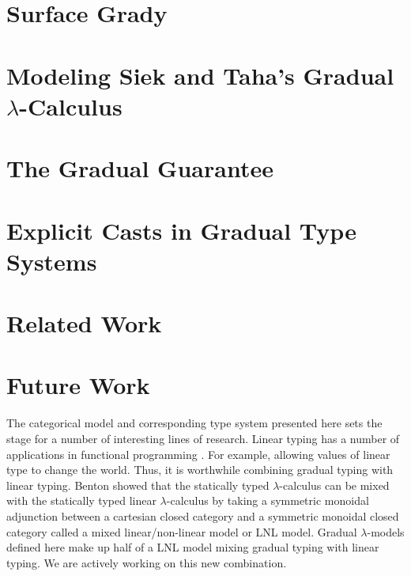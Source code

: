 \documentclass[sigplan]{acmart}\settopmatter{printfolios=true}
\begin{document}
\section{Surface Grady}
\label{sec:surface_grady}


\section{Modeling Siek and Taha's Gradual $\lambda$-Calculus}
\label{sec:modeling_siek_and_taha's_gradual_lambda-calculus}


\section{The Gradual Guarantee}
\label{sec:the_gradual_guarantee}


\section{Explicit Casts in Gradual Type Systems}
\label{sec:explicit_casts_in_gradual_type_systems}


\section{Related Work}
\label{sec:related_work}



\section{Future Work}
\label{sec:conclusion}
The categorical model and corresponding type system presented here
sets the stage for a number of interesting lines of research.  Linear
typing has a number of applications in functional programming
\cite{Wadler:1990}. For example, allowing values of linear type to
change the world.  Thus, it is worthwhile combining gradual typing
with linear typing.  Benton \cite{Benton:1995} showed that the
statically typed $\lambda$-calculus can be mixed with the statically
typed linear $\lambda$-calculus by taking a symmetric monoidal
adjunction between a cartesian closed category and a symmetric
monoidal closed category called a mixed linear/non-linear model or LNL
model.  Gradual $\lambda$-models defined here make up half of a LNL
model mixing gradual typing with linear typing.  We are actively
working on this new combination.
\end{document}
